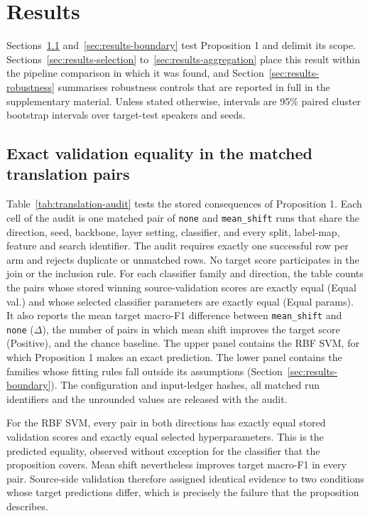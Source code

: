 \section{Results}
\label{sec:results}

Sections~\ref{sec:results-translation} and~\ref{sec:results-boundary} test
Proposition 1 and delimit its scope. Sections~\ref{sec:results-selection}
to~\ref{sec:results-aggregation} place this result within the pipeline
comparison in which it was found, and Section~\ref{sec:results-robustness}
summarises robustness controls that are reported in full in the supplementary
material. Unless stated otherwise, intervals are 95\% paired cluster bootstrap
intervals over target-test speakers and seeds.

\subsection{Exact validation equality in the matched translation pairs}
\label{sec:results-translation}

Table~\ref{tab:translation-audit} tests the stored consequences of
Proposition 1. Each cell of the audit is one matched pair of \texttt{none} and
\texttt{mean\_shift} runs that share the direction, seed, backbone, layer
setting, classifier, and every split, label-map, feature and search identifier.
The audit requires exactly one successful row per arm and rejects duplicate or
unmatched rows. No target score participates in the join or the inclusion
rule. For each classifier family and direction, the table counts the pairs
whose stored winning source-validation scores are exactly equal (Equal val.)
and whose selected classifier parameters are exactly equal (Equal params). It
also reports the mean target macro-F1 difference between \texttt{mean\_shift}
and \texttt{none} ($\Delta$), the number of pairs in which mean shift improves
the target score (Positive), and the chance baseline. The upper panel contains
the RBF SVM, for which Proposition 1 makes an exact prediction. The lower panel
contains the families whose fitting rules fall outside its assumptions
(Section~\ref{sec:results-boundary}). The configuration and input-ledger
hashes, all matched run identifiers and the unrounded values are released with
the audit.



For the RBF SVM, every pair in both directions has exactly equal stored
validation scores and exactly equal selected hyperparameters. This is the
predicted equality, observed without exception for the classifier that the
proposition covers. Mean shift nevertheless improves target macro-F1 in every
pair. Source-side validation therefore assigned identical evidence to two
conditions whose target predictions differ, which is precisely the failure that
the proposition describes.

